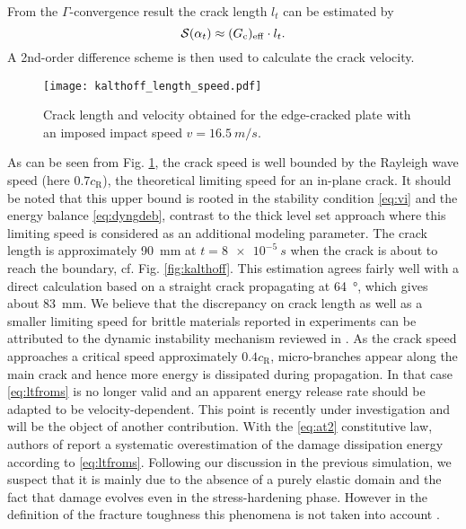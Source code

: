 From the $\Gamma$-convergence result \cite{BourdinFrancfortMarigo:2008} the crack length $l_t$ can be estimated by
\begin{equation} \label{eq:ltfroms}
\mathcal{S}(\alpha_t)\approx(G_\mathrm{c})_\mathrm{eff}\cdot l_t.
\end{equation}
A 2nd-order difference scheme is then used to calculate the crack velocity.
\begin{figure}[htbp]
\centering
\texttt{[image: kalthoff\_length\_speed.pdf]}
\caption{Crack length and velocity obtained for the edge-cracked plate with an imposed impact speed $v=\SI{16.5}{m/s}$.} \label{fig:crack_length_speed}
\end{figure}
As can be seen from Fig. \ref{fig:crack_length_speed}, the crack speed is well bounded by the Rayleigh wave speed (here $0.7c_\mathrm{R}$), the theoretical limiting speed for an in-plane crack. It should be noted that this upper bound is rooted in the stability condition \eqref{eq:vi} and the energy balance \eqref{eq:dyngdeb}, contrast to the thick level set approach \cite{MoreauMoesPicartStainier:2015} where this limiting speed is considered as an additional modeling parameter. The crack length is approximately \SI{90}{mm} at $t=\SI{8e-5}{s}$ when the crack is about to reach the boundary, cf. Fig. \ref{fig:kalthoff}. This estimation agrees fairly well with a direct calculation based on a straight crack propagating at \SI{64}{\degree}, which gives about \SI{83}{mm}. We believe that the discrepancy on crack length as well as a smaller limiting speed for brittle materials reported in experiments can be attributed to the dynamic instability mechanism reviewed in \cite{FinebergMarder:1999}. As the crack speed approaches a critical speed approximately $0.4c_\mathrm{R}$, micro-branches appear along the main crack and hence more energy is dissipated during propagation. In that case \eqref{eq:ltfroms} is no longer valid and an apparent energy release rate should be adapted to be velocity-dependent. This point is recently under investigation and will be the object of another contribution. With the \eqref{eq:at2} constitutive law, authors of \cite{BordenVerhooselScottHughesLandis:2012,VignolletMayBorstVerhoosel:2014} report a systematic overestimation of the damage dissipation energy according to \eqref{eq:ltfroms}. Following our discussion in the previous simulation, we suspect that it is mainly due to the absence of a purely elastic domain and the fact that damage evolves even in the stress-hardening phase. However in the definition of the fracture toughness this phenomena is not taken into account \cite{BourdinFrancfortMarigo:2008}.


